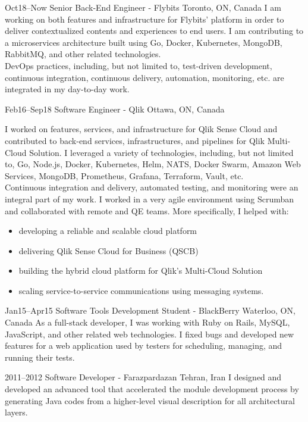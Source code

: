 \documentclass[]{cv-style}                     %
\begin{document}
\begin{entrylist}

  \entry
  {\small Oct18--Now}
  {Senior Back-End Engineer - Flybits}
  {Toronto, ON, Canada}
  {I am working on both features and infrastructure for Flybits' platform in order to deliver contextualized contents and experiences to end users.
   I am contributing to a microservices architecture built using Go, Docker, Kubernetes, MongoDB, RabbitMQ, and other related technologies. \\
   DevOps practices, including, but not limited to, test-driven development, continuous integration, continuous delivery, automation, monitoring, etc. are integrated in my day-to-day work.}

  \entry
  {\small Feb16--Sep18}
  {Software Engineer - Qlik}
  {Ottawa, ON, Canada}
  {I worked on features, services, and infrastructure for Qlik Sense Cloud and
   contributed to back-end services, infrastructures, and pipelines for Qlik Multi-Cloud Solution.
   I leveraged a variety of technologies, including, but not limited to, Go, Node.js, Docker, Kubernetes, Helm,
   NATS, Docker Swarm, Amazon Web Services, MongoDB, Prometheus, Grafana, Terraform, Vault, etc. \\
   Continuous integration and delivery, automated testing, and monitoring were an integral part of my work.
   I worked in a very agile environment using Scrumban and collaborated with remote and QE teams.
   More specifically, I helped with:
     \begin{itemize}
         \item developing a reliable and scalable cloud platform
         \item delivering Qlik Sense Cloud for Business (QSCB)
         \item building the hybrid cloud platform for Qlik's Multi-Cloud Solution
         \item scaling service-to-service communications using messaging systems. 
     \end{itemize}
   }

  \entry
  {\small Jan15--Apr15}
  {Software Tools Development Student - BlackBerry}
  {Waterloo, ON, Canada}
  {As a full-stack developer, I was working with Ruby on Rails, MySQL, JavaScript, and other related web technologies.
   I fixed bugs and developed new features for a web application used by testers for scheduling, managing, and running their tests.}

  \entry
  {\small 2011--2012}
  {Software Developer - Farazpardazan}
  {Tehran, Iran}
  {I designed and developed an advanced tool that accelerated the module development process by
   generating Java codes from a higher-level visual description for all architectural layers.}


\end{entrylist}
\end{document}
